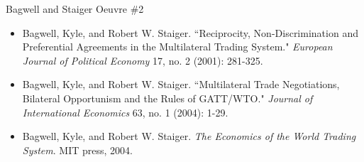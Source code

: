 \documentclass[aspectratio=169]{beamer}
\begin{document}

\begin{frame}{Bagwell and Staiger Oeuvre \#2}

\begin{itemize}
    \item Bagwell, Kyle, and Robert W. Staiger. ``Reciprocity, Non-Discrimination and Preferential Agreements in the Multilateral Trading System." \emph{European Journal of Political Economy} 17, no. 2 (2001): 281-325.
    \item Bagwell, Kyle, and Robert W. Staiger. ``Multilateral Trade Negotiations, Bilateral Opportunism and the Rules of GATT/WTO." \emph{Journal of International Economics} 63, no. 1 (2004): 1-29.
    \item Bagwell, Kyle, and Robert W. Staiger. \emph{The Economics of the World Trading System}. MIT press, 2004. 
\end{itemize}
    
\end{frame}

\end{document}
